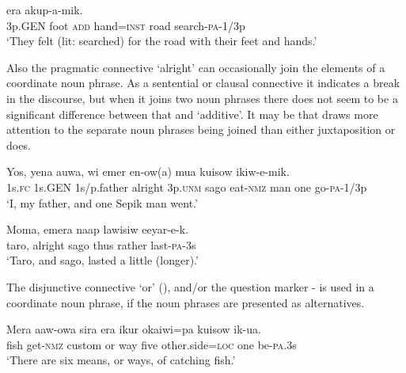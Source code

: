 \ea%
\label{ex:x894}
\gll {}     era  akup-a-mik. \\
    3p.GEN  foot  \textsc{add}  hand=\textsc{inst}  road  search-\textsc{pa}-1/3p  \\
\glt`They felt (lit: searched) for the road with their feet and hands.'
\z





Also the pragmatic connective  `alright' can occasionally join the elements of a coordinate noun phrase. As a sentential or clausal connective it indicates a break in the discourse, but when it joins two noun phrases there does not seem to be a significant difference between that and  `additive'. It may be that  draws more attention to the separate noun phrases being joined than either juxtaposition or  does.

\ea%
\label{ex:x815}
\gll Yos,  yena  auwa,    wi  emer  en-ow(a)  mua  kuisow  ikiw-e-mik.\\
     1s.\textsc{fc}  1s.GEN  1s/p.father  alright  3p.\textsc{unm}  sago  eat-\textsc{nmz}  man one  go-\textsc{pa}-1/3p\\
\glt`I, my father, and one Sepik man went.'
\z









\ea%
\label{ex:x816}
\gll Moma,    emera  naap  lawisiw  eeyar-e-k. \\
   taro,  alright  sago  thus  rather  last-\textsc{pa}-3s   \\
\glt`Taro, and sago, lasted a little (longer).'
\z





The disjunctive connective  `or' (), and/or the question marker -  is used in a coordinate noun phrase, if the noun phrases are presented as alternatives. 

\ea%
\label{ex:x817}
\gll Mera  aaw-owa  sira    era  ikur  okaiwi=pa  kuisow ik-ua. \\
   fish  get-\textsc{nmz}  custom  or  way  five  other.side=\textsc{loc}  one   be-\textsc{pa}.3s  \\
\glt`There are six means, or ways, of catching fish.'
\z









